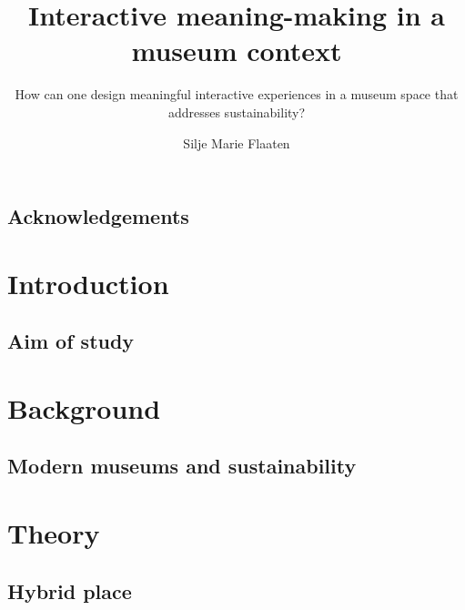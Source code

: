 \documentclass[UKenglish]{ifimaster}
\title{Interactive meaning-making in a museum context}
\subtitle{How can one design meaningful interactive experiences in a museum space that addresses sustainability?}
\author{Silje Marie Flaaten}
\begin{document}
\duoforside[dept={Department of Informatics}, program={Informatics: design, use, interaction},long]



\frontmatter{}
\chapter*{Acknowledgements}


%

\tableofcontents{}
\listoffigures{}

% 

\mainmatter{}
\part{Introduction}
\chapter{Aim of study}


\part{Background}
\chapter{Modern museums and sustainability}


% 


\part{Theory}


\chapter{Hybrid place}

\end{document}
